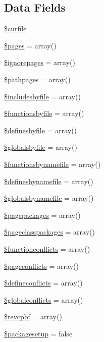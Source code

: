 \subsection*{\-Data \-Fields}
\begin{DoxyCompactItemize}
\item 
\hyperlink{class_procedural_pages_a84352b4d740a45279b61228864b9b5e7}{\$curfile}
\item 
\hyperlink{class_procedural_pages_a263621399c53f2952c2329ee13ad8e4e}{\$pages} = array()
\item 
\hyperlink{class_procedural_pages_a3ee70761f9201a9b717b969526f4cf91}{\$ignorepages} = array()
\item 
\hyperlink{class_procedural_pages_ad6e296ccd3b91bbf76e563c74385dd61}{\$pathpages} = array()
\item 
\hyperlink{class_procedural_pages_aa3a68ad0927d9cfb1e8c87048375322a}{\$includesbyfile} = array()
\item 
\hyperlink{class_procedural_pages_ad289404b98cf1f85f75042ddebf2e5c3}{\$functionsbyfile} = array()
\item 
\hyperlink{class_procedural_pages_a5fd9624434a969d6c18cb57216131a9d}{\$definesbyfile} = array()
\item 
\hyperlink{class_procedural_pages_a66416e77330fb9944e988e026fb870ce}{\$globalsbyfile} = array()
\item 
\hyperlink{class_procedural_pages_ad74f7a6d1bedafd5149fe4b10e16d3fe}{\$functionsbynamefile} = array()
\item 
\hyperlink{class_procedural_pages_adcb4f118bec255d316667f064d6fa24c}{\$definesbynamefile} = array()
\item 
\hyperlink{class_procedural_pages_af52501416e46795705bcefc529cbfb59}{\$globalsbynamefile} = array()
\item 
\hyperlink{class_procedural_pages_a00eab2d919d2f34e77bed9fa19a32b2a}{\$pagepackages} = array()
\item 
\hyperlink{class_procedural_pages_a1a9655301a7cc9cce336d051d850de95}{\$pageclasspackages} = array()
\item 
\hyperlink{class_procedural_pages_a8bb2f1cb74fe52fa701033398f005d26}{\$functionconflicts} = array()
\item 
\hyperlink{class_procedural_pages_ade701f6942125422da1b27586702c655}{\$pageconflicts} = array()
\item 
\hyperlink{class_procedural_pages_a6f24d4cebb4c89eda4d01a52b8382b28}{\$defineconflicts} = array()
\item 
\hyperlink{class_procedural_pages_a95e2576c016d42d6546a65994032ed88}{\$globalconflicts} = array()
\item 
\hyperlink{class_procedural_pages_a7b960874a2bd62df1a63a44e7d1c9fbc}{\$revcpbf} = array()
\item 
\hyperlink{class_procedural_pages_a8b081238ba656c404291aca4cd30ab17}{\$packagesetup} = false
\end{DoxyCompactItemize}


